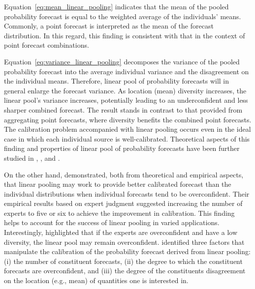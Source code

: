 \documentclass[11pt]{article}
\begin{document}
Equation~\eqref{eq:mean_linear_pooling} indicates that the mean of the pooled probability forecast is equal to the weighted average of the individuals' means. Commonly, a point forecast is interpreted as the mean of the forecast distribution. In this regard, this finding is consistent with that in the context of point forecast combinations.

Equation~\eqref{eq:variance_linear_pooling} decomposes the variance of the pooled probability forecast into the average individual variance and the disagreement on the individual means. Therefore, linear pool of probability forecasts will in general enlarge the forecast variance. As location (mean) diversity increases, the linear pool's variance increases, potentially leading to an underconfident and less sharper combined forecast. The result stands in contrast to that provided from aggregating point forecasts, where diversity benefits the combined point forecasts. The calibration problem accompanied with linear pooling occurs even in the ideal case in which each individual source is well-calibrated. Theoretical aspects of this finding and properties of linear pool of probability forecasts have been further studied in \citet{Hora2004-fz}, \citet{Ranjan2010-jl}, and \citet{Lichtendahl2013-rt}.

On the other hand, \citet{Hora2004-fz} demonstrated, both from theoretical and empirical aspects, that linear pooling may work to provide better calibrated forecast than the individual distributions when individual forecasts tend to be overconfident. Their empirical results based on expert judgment suggested increasing the number of experts to five or six to achieve the improvement in calibration. This finding helps to account for the success of linear pooling in varied applications. Interestingly, \citet{Jose2014-uh} highlighted that if the experts are overconfident and have a low diversity, the linear pool may remain overconfident. \citet{Lichtendahl2013-rt} identified three factors that manipulate the calibration of the probability forecast derived from linear pooling: (i) the number of constituent forecasts, (ii) the degree to which the constituent forecasts are overconfident, and (iii) the degree of the constituents disagreement on the location (e.g., mean) of quantities one is interested in.
\end{document}
